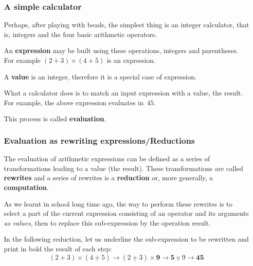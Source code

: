 \documentclass[compress,dvipdfmx]{beamer}
\begin{document}
%
\begin{frame}
  \frametitle{A simple calculator}

  Perhaps, after playing with beads, the simplest thing is an integer
  calculator, that is, integers and the four basic arithmetic
  operators.

  \bigskip

  An \textbf{expression} may be built using these operations, integers
  and parentheses. For example \((2+3)\times(4+5)\) is an expression.

  \bigskip

  A \textbf{value}  is an integer, therefore  it is a special  case of
  expression.

  \bigskip

  What a calculator does is to match an input expression with a value,
  the result. For example, the above expression evaluates in~\(45\).

  \bigskip

  This process is called \textbf{evaluation}.

\end{frame}

%
\begin{frame}
  \frametitle{Evaluation as rewriting expressions/Reductions}

  The evaluation of arithmetic expressions can be defined as a series
  of transformations leading to a value (the result). These
  transformations are called \textbf{rewrites} and a series of
  rewrites is a \textbf{reduction} or, more generally, a
  \textbf{computation}.

  \bigskip

  As we learnt in school long time ago, the way to perform these
  rewrites is to select a part of the current expression consisting of
  an operator and its arguments \emph{as values}, then to replace this
  sub-expression by the operation result.

  \bigskip

  In the following reduction, let us underline the sub-expression to
  be rewritten and print in bold the result of each step:
  \begin{equation*}
    (2+3) \times (\underline{4+5}) \rightarrow (\underline{2+3})
    \times \textbf{9} \rightarrow \underline{\textbf{5} \times 9}
    \rightarrow \textbf{45}
  \end{equation*}

\end{frame}
\end{document}
